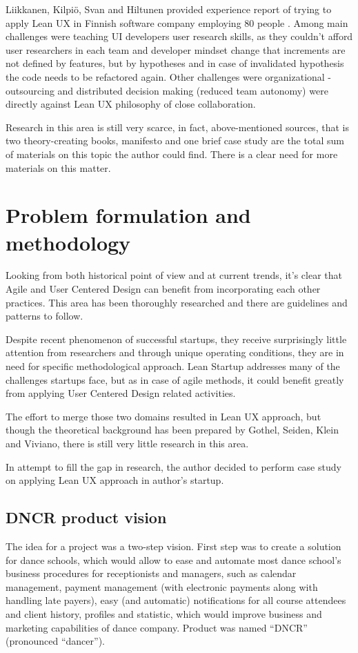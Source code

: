 \documentclass{article}
\begin{document}
Liikkanen, Kilpiö, Svan and Hiltunen provided experience report of trying to apply Lean UX in Finnish software company employing 80 people \cite{liikkanen2014lean}. Among main challenges were teaching UI developers user research skills, as they couldn't afford user researchers in each team and developer mindset change that increments are not defined by features, but by hypotheses and in case of invalidated hypothesis the code needs to be refactored again. Other challenges were organizational - outsourcing and distributed decision making (reduced team autonomy) were directly against Lean UX philosophy of close collaboration.

Research in this area is still very scarce, in fact, above-mentioned sources, that is two theory-creating books, manifesto and one brief case study are the total sum of materials on this topic the author could find. There is a clear need for more materials on this matter.

\section{Problem formulation and methodology}
Looking from both historical point of view and at current trends, it's clear that Agile and User Centered Design can benefit from incorporating each other practices. This area has been thoroughly researched and there are guidelines and patterns to follow.

Despite recent phenomenon of successful startups, they receive surprisingly little attention from researchers and through unique operating conditions, they are in need for specific methodological approach. Lean Startup addresses many of the challenges startups face, but as in case of agile methods, it could benefit greatly from applying User Centered Design related activities.

The effort to merge those two domains resulted in Lean UX approach, but though the theoretical background has been prepared by Gothel, Seiden, Klein and Viviano, there is still very little research in this area.

In attempt to fill the gap in research, the author decided to perform case study on applying Lean UX approach in author's startup.

\subsection{DNCR product vision}
The idea for a project was a two-step vision. First step was to create a solution for dance schools, which would allow to ease and automate most dance school's business procedures for receptionists and managers, such as calendar management, payment management (with electronic payments along with handling late payers), easy (and automatic) notifications for all course attendees and client history, profiles and statistic, which would improve business and marketing capabilities of dance company. Product was named ``DNCR'' (pronounced ``dancer'').
\end{document}
